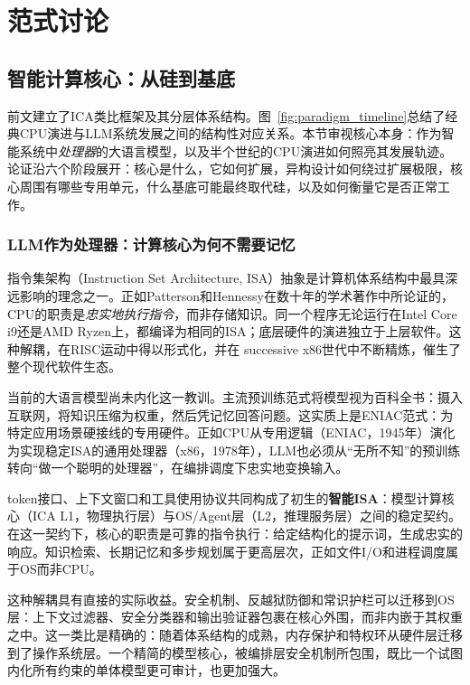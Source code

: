 \section{范式讨论}
\label{sec:paradigm}

\subsection{智能计算核心：从硅到基底}

前文建立了ICA类比框架及其分层体系结构。图~\ref{fig:paradigm_timeline}总结了经典CPU演进与LLM系统发展之间的结构性对应关系。本节审视核心本身：作为智能系统中\textit{处理器}的大语言模型，以及半个世纪的CPU演进如何照亮其发展轨迹。论证沿六个阶段展开：核心是什么，它如何扩展，异构设计如何绕过扩展极限，核心周围有哪些专用单元，什么基底可能最终取代硅，以及如何衡量它是否正常工作。



\subsubsection{LLM作为处理器：计算核心为何不需要记忆}

指令集架构（Instruction Set Architecture, ISA）抽象是计算机体系结构中最具深远影响的理念之一。正如Patterson和Hennessy在数十年的学术著作中所论证的，CPU的职责是\textit{忠实地执行指令}，而非存储知识\cite{patterson_hennessy_2017}。同一个程序无论运行在Intel Core i9还是AMD Ryzen上，都编译为相同的ISA；底层硬件的演进独立于上层软件。这种解耦，在RISC运动中得以形式化，并在 successive x86世代中不断精炼，催生了整个现代软件生态。

当前的大语言模型尚未内化这一教训。主流预训练范式将模型视为百科全书：摄入互联网，将知识压缩为权重，然后凭记忆回答问题。这实质上是ENIAC范式：为特定应用场景硬接线的专用硬件\cite{patterson_hennessy_2017}。正如CPU从专用逻辑（ENIAC，1945年）演化为实现稳定ISA的通用处理器（x86，1978年），LLM也必须从``无所不知''的预训练转向``做一个聪明的处理器''，在编排调度下忠实地变换输入。

token接口、上下文窗口和工具使用协议共同构成了初生的\textbf{智能ISA}：模型计算核心（ICA L1，物理执行层）与OS/Agent层（L2，推理服务层）之间的稳定契约。在这一契约下，核心的职责是可靠的指令执行：给定结构化的提示词，生成忠实的响应。知识检索、长期记忆和多步规划属于更高层次，正如文件I/O和进程调度属于OS而非CPU。

这种解耦具有直接的实际收益。安全机制、反越狱防御和常识护栏可以迁移到OS层：上下文过滤器、安全分类器和输出验证器包裹在核心外围，而非内嵌于其权重之中。这一类比是精确的：随着体系结构的成熟，内存保护和特权环从硬件层迁移到了操作系统层\cite{ritchie_thompson_1974}。一个精简的模型核心，被编排层安全机制所包围，既比一个试图内化所有约束的单体模型更可审计，也更加强大。

